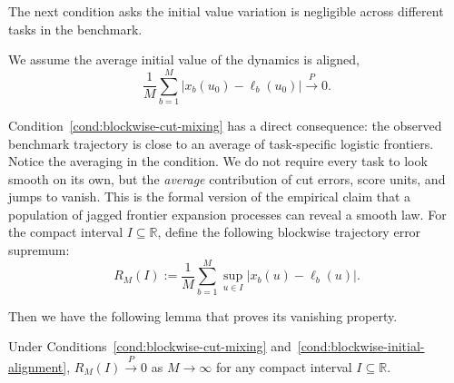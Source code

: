 The next condition asks the initial value variation is negligible across different tasks in the benchmark.

\begin{condition}
    \label{cond:blockwise-initial-alignment}
    We assume the average initial value of the dynamics is aligned,
    \[
        \frac{1}{M}\sum_{b=1}^M |x_b(u_0)-\ell_b(u_0)| \stackrel{P}{\longrightarrow} 0.
    \]
\end{condition}

Condition~\ref{cond:blockwise-cut-mixing} has a direct consequence: the observed benchmark trajectory is close to an average of task-specific logistic frontiers. Notice the averaging in the condition. We do not require every task to look smooth on its own, but the \emph{average} contribution of cut errors, score units, and jumps to vanish. This is the formal version of the empirical claim that a population of jagged frontier expansion processes can reveal a smooth law. For the compact interval \(I \subseteq \mathbb{R}\), define the following blockwise trajectory error supremum:
\begin{equation}
    R_M(I):=\frac1M\sum_{b=1}^{M}\sup_{u\in I}|x_b(u)-\ell_b(u)|.
    \label{eq:R-M-new}
\end{equation}

Then we have the following lemma that proves its vanishing property.

\begin{lemma}
\label{lem:average-task-logistic-approx}
Under Conditions~\ref{cond:blockwise-cut-mixing} and~\ref{cond:blockwise-initial-alignment}, $R_M(I)\stackrel{P}{\to} 0$ as \(M \to \infty\) for any compact interval $I \subseteq \mathbb{R}$. 
\end{lemma}

